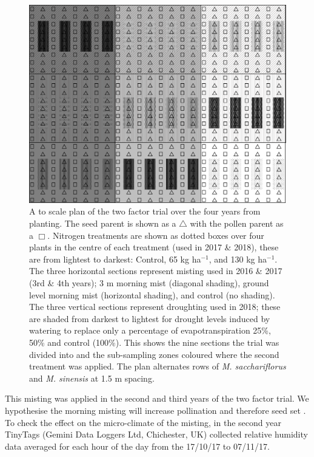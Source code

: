 \documentclass[fleqn, 15pt, lineno]{olplainarticle}
\begin{document}
\begin{figure}
\centering
\includegraphics[width=1.1\textwidth]{Figs/CAT20Plan}
\caption{\label{fig:twoFactorPlan} A to scale plan of the two factor trial over the four years from planting.
The seed parent is shown as a $\bigtriangleup$ with the pollen parent as a $\Box$.
Nitrogen treatments are shown as dotted boxes over four plants in the centre of each treatment (used in 2017 \& 2018), these are from lightest to darkest: Control, 65 kg ha$^{-1}$, and 130 kg ha$^{-1}$.
The three horizontal sections represent misting used in 2016 \& 2017 (3rd \& 4th years); 3 m morning mist (diagonal shading), ground level morning mist (horizontal shading), and control (no shading).
The three vertical sections represent droughting used in 2018; these are shaded from darkest to lightest for drought levels induced by watering to replace only a percentage of evapotranspiration 25\%, 50\% and control (100\%).
This shows the nine sections the trial was divided into and the sub-sampling zones coloured where the second treatment was applied.
The plan alternates rows of \textit{M. sacchariflorus} and \textit{M. sinensis} at 1.5 m spacing.}
\end{figure}


This misting was applied in the second and third years of the two factor trial.
We hypothesise the morning misting will increase pollination and therefore seed set \citep{Clifton-Brown2018_pcb}.
To check the effect on the micro-climate of the misting, in the second year TinyTags (Gemini Data Loggers Ltd, Chichester, UK) collected relative humidity data averaged for each hour of the day from the 17/10/17 to 07/11/17.
\end{document}
